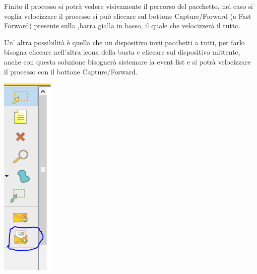 Finito il processo si potrà vedere visivamente il percorso del pacchetto, nel caso si voglia velocizzare il processo si può cliccare sul bottone Capture/Forward (o Fast Forward) presente sulla ,barra gialla in basso, il quale che velocizzerà il tutto.

Un' altra possibilità è quella che un dispositivo invii pacchetti a tutti, per farlo bisogna cliccare nell'altra icona della busta e cliccare sul dispositivo mittente, anche con questa soluzione bisognerà sistemare la event list e si potrà velocizzare il processo con il bottone Capture/Forward.

\begin{center}
    \includegraphics[width=\linewidth]{images/04.debugging-rete/07.png}

\end{center}
